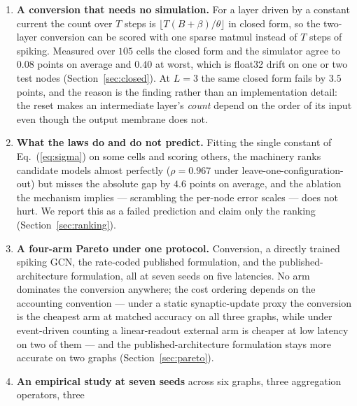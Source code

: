 \documentclass[10pt,twocolumn]{article}
\newcommand{\secref}[1]{Section~\ref{#1}}
\newcommand{\eqnref}[1]{Eq.~(\ref{#1})}
\begin{document}
\begin{enumerate}
$G^{0.95}$ with $r=0.990$, so the latency a deep model will need is computable from its weights
before any simulation (\secref{sec:depth}). Two natural repairs---gauge-normalising each layer, or
rescaling the readout---do not work, and we say why: the spike threshold is an absolute scale, so
$G$ cannot be reparametrised away. Conversion therefore favours shallow, sufficient-width models,
and width is the lever that does work: the layer-1 error norm grows as $\sqrt{H}$ while the logit
margin grows with it, so the fidelity gap stays near zero up to $H=64$ even though the ANN gains
$0.8$--$1.9$ points.
\item \textbf{A conversion that needs no simulation.} For a layer driven by a constant current the
count over $T$ steps is $\lfloor T(B+\beta)/\theta\rfloor$ in closed form, so the two-layer
conversion can be scored with one sparse matmul instead of $T$ steps of spiking. Measured over $105$
cells the closed form and the simulator agree to $0.08$ points on average and $0.40$ at worst, which
is float32 drift on one or two test nodes (\secref{sec:closed}). At $L=3$ the same closed form fails
by $3.5$ points, and the reason is the finding rather than an implementation detail: the reset makes
an intermediate layer's \emph{count} depend on the order of its input even though the output
membrane does not.
\item \textbf{What the laws do and do not predict.} Fitting the single constant of
\eqnref{eq:sigma} on some cells and scoring others, the machinery ranks candidate models almost
perfectly ($\rho=0.967$ under leave-one-configuration-out) but misses the absolute gap by $4.6$
points on average, and the ablation the mechanism implies --- scrambling the per-node error scales
--- does not hurt. We report this as a failed prediction and claim only the ranking
(\secref{sec:ranking}).
\item \textbf{A four-arm Pareto under one protocol.} Conversion, a directly trained spiking GCN, the
rate-coded published formulation, and the published-architecture formulation, all at seven seeds on
five latencies. No arm dominates the conversion anywhere; the cost ordering depends on the
accounting convention --- under a static synaptic-update proxy the conversion is the cheapest arm at
matched accuracy on all three graphs, while under event-driven counting a linear-readout external
arm is cheaper at low latency on two of them --- and the published-architecture formulation stays
more accurate on two graphs (\secref{sec:pareto}).
\item \textbf{An empirical study at seven seeds} across six graphs, three aggregation operators, three

\end{enumerate}
\end{document}
